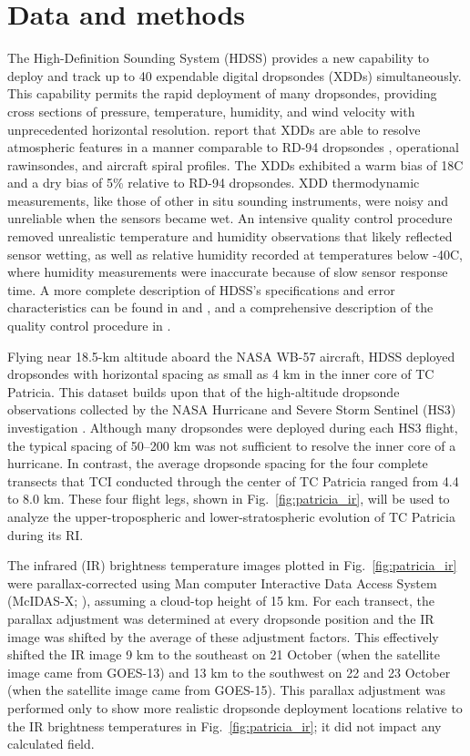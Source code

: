 \section{Data and methods}
The High-Definition Sounding System (HDSS) provides a new capability to deploy and track up to 40 expendable digital dropsondes (XDDs) simultaneously.
This capability permits the rapid deployment of many dropsondes, providing cross sections of pressure, temperature, humidity, and wind velocity with unprecedented horizontal resolution.
\cite{Blacketal2017} report that XDDs are able to resolve atmospheric features in a manner comparable to RD-94 dropsondes \cite{HockFranklin1999}, operational rawinsondes, and aircraft spiral profiles.
The XDDs exhibited a warm bias of 18C and a dry bias of 5\% relative to RD-94 dropsondes.
XDD thermodynamic measurements, like those of other in situ sounding instruments, were noisy and unreliable when the sensors became wet.
An intensive quality control procedure \cite{BellTCI} removed unrealistic temperature and humidity observations that likely reflected sensor wetting, as well as relative humidity recorded at temperatures below -40\textdegree{}C, where humidity measurements were inaccurate because of slow sensor response time.
A more complete description of HDSS’s specifications and error characteristics can be found in \cite{Blacketal2017} and \cite{DoyleTCI}, and a comprehensive description of the quality control procedure in \cite{BellTCI}.

Flying near 18.5-km altitude aboard the NASA WB-57 aircraft, HDSS deployed dropsondes with horizontal spacing as small as 4 km in the inner core of TC Patricia.
This dataset builds upon that of the high-altitude dropsonde observations collected by the NASA Hurricane and Severe Storm Sentinel (HS3) investigation \cite{Braunetal2016}.
Although many dropsondes were deployed during each HS3 flight, the typical spacing of 50–200 km was not sufficient to resolve the inner core of a hurricane. In contrast, the average dropsonde spacing for the four complete transects that TCI conducted through the center of TC Patricia ranged from 4.4 to 8.0 km. 
These four flight legs, shown in Fig.~\ref{fig:patricia_ir}, will be used to analyze the upper-tropospheric and lower-stratospheric evolution of TC Patricia during its RI.

The infrared (IR) brightness temperature images plotted in Fig.~\ref{fig:patricia_ir} were parallax-corrected using Man
computer Interactive Data Access System (McIDAS-X; \citeauthor{Lazzaraetal1999} \citeyear{Lazzaraetal1999}), assuming a cloud-top height of 15 km.
For each transect, the parallax adjustment was determined at every dropsonde position and the IR image was shifted by the average of these adjustment factors.
This effectively shifted the IR image 9 km to the southeast on 21 October (when the satellite image came from GOES-13) and 13 km to the southwest on 22 and 23 October (when the satellite image came from GOES-15).
This parallax adjustment was performed only to show more realistic dropsonde deployment locations relative to the IR brightness temperatures in Fig.~\ref{fig:patricia_ir}; it did not impact any calculated field.

